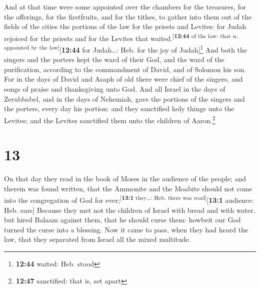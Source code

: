  And at that time were some appointed over the chambers
for the treasures, for the offerings, for the firstfruits, and for the
tithes, to gather into them out of the fields of the cities the portions
of the law for the priests and Levites: for Judah rejoiced for the
priests and for the Levites that
waited.\textsuperscript{{[}\textbf{12:44} of the law: that is, appointed
by the law{]}}{[}\textbf{12:44} for Judah\ldots: Heb. for the joy of
Judah{]}\footnote{\textbf{12:44} waited: Heb. stood}  And
both the singers and the porters kept the ward of their God, and the
ward of the purification, according to the commandment of David, and of
Solomon his son.  For in the days of David and Asaph of
old there were chief of the singers, and songs of praise and
thanksgiving unto God.  And all Israel in the days of
Zerubbabel, and in the days of Nehemiah, gave the portions of the
singers and the porters, every day his portion: and they sanctified holy
things unto the Levites; and the Levites sanctified them unto the
children of Aaron.\footnote{\textbf{12:47} sanctified: that is, set
  apart}

\hypertarget{section-12}{%
\section{13}\label{section-12}}

 On that day they read in the book of Moses in the
audience of the people; and therein was found written, that the Ammonite
and the Moabite should not come into the congregation of God for
ever;\textsuperscript{{[}\textbf{13:1} they\ldots: Heb. there was
read{]}}{[}\textbf{13:1} audience: Heb. ears{]}  Because
they met not the children of Israel with bread and with water, but hired
Balaam against them, that he should curse them: howbeit our God turned
the curse into a blessing.  Now it came to pass, when they
had heard the law, that they separated from Israel all the mixed
multitude.

